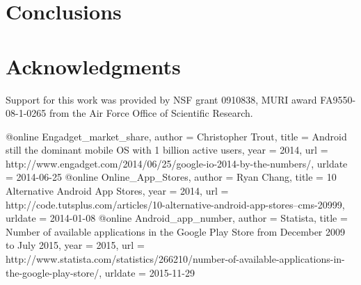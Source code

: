 \section{Conclusions}
\label{concl}

\section{Acknowledgments}
Support for this work was provided by NSF grant 0910838, MURI award FA9550-08-1-0265 from the Air Force Office of Scientific Research.

@online {Engadget_market_share,
  author = {Christopher Trout},
  title = {Android still the dominant mobile OS with 1 billion active users},
  year = 2014,
  url = {http://www.engadget.com/2014/06/25/google-io-2014-by-the-numbers/},
  urldate = {2014-06-25}
}
@online {Online_App_Stores,
  author = {Ryan Chang},
  title = {10 Alternative Android App Stores},
  year = 2014,
  url = {http://code.tutsplus.com/articles/10-alternative-android-app-stores--cms-20999},
  urldate = {2014-01-08}
}
@online {Android_app_number,
  author = {Statista},
  title = {Number of available applications in the Google Play Store from December 2009 to July 2015},
  year = 2015,
  url = {http://www.statista.com/statistics/266210/number-of-available-applications-in-the-google-play-store/},
  urldate = {2015-11-29}
}

%
%

